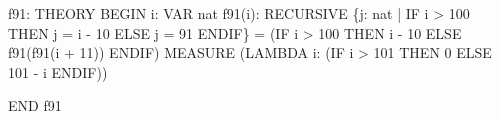 f91: THEORY
  BEGIN
  i: VAR nat
  f91(i):
    RECURSIVE \{j: nat | IF i > 100 THEN j = i - 10 ELSE j = 91 ENDIF\} =
      (IF i > 100 THEN i - 10 ELSE f91(f91(i + 11)) ENDIF)
    MEASURE (LAMBDA i: (IF i > 101 THEN 0 ELSE 101 - i ENDIF))
     
  END f91
